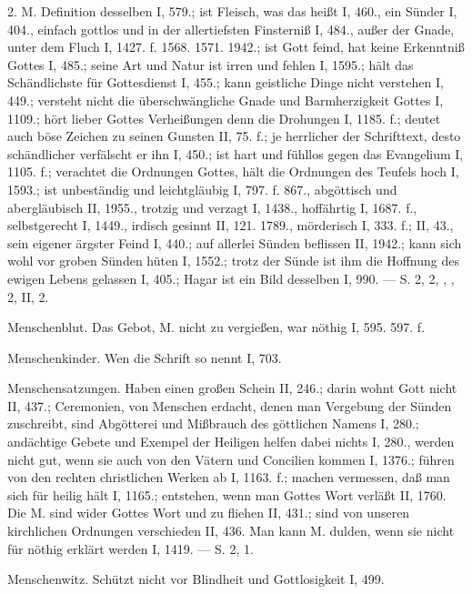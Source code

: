 2.  M. Definition desselben I, 579.; ist Fleisch, was das heißt I, 460., ein Sünder I, 404., einfach gottlos und in der allertiefsten Finsterniß I, 484., außer der Gnade, unter dem Fluch I, 1427. f. 1568. 1571. 1942.; ist Gott feind, hat keine Erkenntniß Gottes I, 485.; seine Art und Natur ist irren und fehlen I, 1595.; hält das Schändlichste für Gottesdienst I, 455.; kann geistliche Dinge nicht verstehen I, 449.; versteht nicht die überschwängliche Gnade und Barmherzigkeit Gottes I, 1109.; hört lieber Gottes Verheißungen denn die Drohungen I, 1185. f.; deutet auch böse Zeichen zu seinen Gunsten II, 75. f.; je herrlicher der Schrifttext, desto schändlicher verfälscht er ihn I, 450.; ist hart und fühllos gegen das Evangelium I, 1105. f.; verachtet die Ordnungen Gottes, hält die Ordnungen des Teufels hoch I, 1593.; ist unbeständig und leichtgläubig I, 797. f. 867., abgöttisch und abergläubisch II, 1955., trotzig und verzagt I, 1438., hoffährtig I, 1687. f., selbstgerecht I, 1449., irdisch gesinnt II, 121. 1789., mörderisch I, 333. f.; II, 43., sein eigener ärgster Feind I, 440.; auf allerlei Sünden beflissen II, 1942.; kann sich wohl vor groben Sünden hüten I, 1552.; trotz der Sünde ist ihm die Hoffnung des ewigen Lebens gelassen I, 405.; Hagar ist ein Bild desselben I, 990. — S.  2,  2, , ,  2,  II, 2.

Menschenblut. Das Gebot, M. nicht zu vergießen, war nöthig I, 595. 597. f.

Menschenkinder. Wen die Schrift so nennt I, 703.

Menschensatzungen. Haben einen großen Schein II, 246.; darin wohnt Gott nicht II, 437.; Ceremonien, von Menschen erdacht, denen man Vergebung der Sünden zuschreibt, sind Abgötterei und Mißbrauch des göttlichen Namens I, 280.; andächtige Gebete und Exempel der Heiligen helfen dabei nichts I, 280., werden nicht gut, wenn sie auch von den Vätern und Concilien kommen I, 1376.; führen von den rechten christlichen Werken ab I, 1163. f.; machen vermessen, daß man sich für heilig hält I, 1165.; entstehen, wenn man Gottes Wort verläßt II, 1760. Die  M. sind wider Gottes Wort und zu fliehen II, 431.; sind von unseren kirchlichen Ordnungen verschieden II, 436. Man kann M. dulden, wenn sie nicht für nöthig erklärt werden I, 1419. — S.  2,  1.

Menschenwitz. Schützt nicht vor Blindheit und Gottlosigkeit I, 499.

